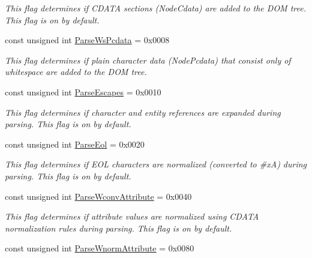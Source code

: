 \begin{DoxyCompactItemize}
\begin{DoxyCompactList}\small\item\em This flag determines if CDATA sections (NodeCdata) are added to the DOM tree. This flag is on by default. \item\end{DoxyCompactList}\item 
const unsigned int \hyperlink{namespacephys_1_1xml_a48c0da99d1ed62b1a4984293e64828c6}{ParseWsPcdata} = 0x0008
\begin{DoxyCompactList}\small\item\em This flag determines if plain character data (NodePcdata) that consist only of whitespace are added to the DOM tree. \item\end{DoxyCompactList}\item 
\hypertarget{namespacephys_1_1xml_a6463412ba9e404b6890e4721255cd8ed}{
const unsigned int \hyperlink{namespacephys_1_1xml_a6463412ba9e404b6890e4721255cd8ed}{ParseEscapes} = 0x0010}
\label{d9/d27/namespacephys_1_1xml_a6463412ba9e404b6890e4721255cd8ed}

\begin{DoxyCompactList}\small\item\em This flag determines if character and entity references are expanded during parsing. This flag is on by default. \item\end{DoxyCompactList}\item 
\hypertarget{namespacephys_1_1xml_a52af747730d2b3a313eebed4cf49a333}{
const unsigned int \hyperlink{namespacephys_1_1xml_a52af747730d2b3a313eebed4cf49a333}{ParseEol} = 0x0020}
\label{d9/d27/namespacephys_1_1xml_a52af747730d2b3a313eebed4cf49a333}

\begin{DoxyCompactList}\small\item\em This flag determines if EOL characters are normalized (converted to \#xA) during parsing. This flag is on by default. \item\end{DoxyCompactList}\item 
\hypertarget{namespacephys_1_1xml_af9f7575e3cb8a0d8ad9a7ceee5e26983}{
const unsigned int \hyperlink{namespacephys_1_1xml_af9f7575e3cb8a0d8ad9a7ceee5e26983}{ParseWconvAttribute} = 0x0040}
\label{d9/d27/namespacephys_1_1xml_af9f7575e3cb8a0d8ad9a7ceee5e26983}

\begin{DoxyCompactList}\small\item\em This flag determines if attribute values are normalized using CDATA normalization rules during parsing. This flag is on by default. \item\end{DoxyCompactList}\item 
\hypertarget{namespacephys_1_1xml_acddcc88320f06c933c67cdd77704c838}{
const unsigned int \hyperlink{namespacephys_1_1xml_acddcc88320f06c933c67cdd77704c838}{ParseWnormAttribute} = 0x0080}
\label{d9/d27/namespacephys_1_1xml_acddcc88320f06c933c67cdd77704c838}


\end{DoxyCompactItemize}
